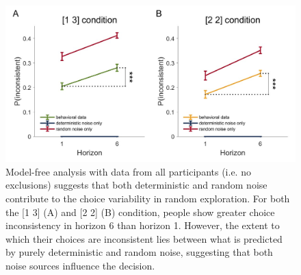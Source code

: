 \documentclass[12pt]{article}
\begin{document}
	\begin{figure}[H]
		\begin{center}
			\includegraphics[width=\textwidth]{figures/RanDetNoise_pinconsistent__all.jpg}
			\caption{Model-free analysis with data from all participants (i.e. no exclusions) suggests that both deterministic and random noise contribute to the choice variability in random exploration. For both the [1 3] (A) and [2 2] (B) condition, people show greater choice inconsistency in horizon 6 than horizon 1. However, the extent to which their choices are inconsistent lies between what is predicted by purely deterministic and random noise, suggesting that both noise sources influence the decision.}
			\label{fig:mf22}
		\end{center}
	\end{figure}
	\newpage
\end{document}
